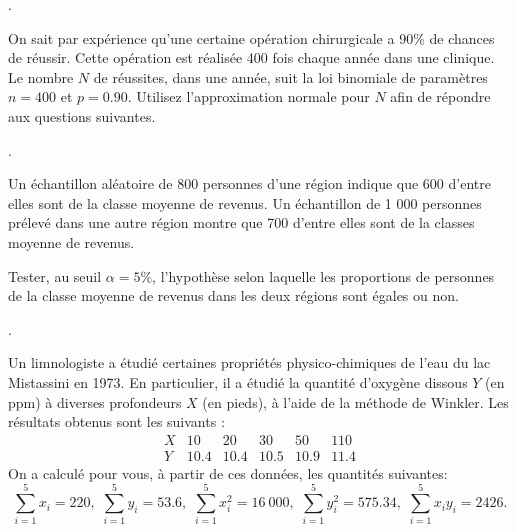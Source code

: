 \begin{questions}
\begin{parts}
\end{parts}




\newpage
.
\newpage

\question \label{assu}
On sait par expérience qu’une certaine opération chirurgicale a 90\% de
chances de réussir. Cette opération est réalisée  400 fois chaque année dans une clinique.
Le nombre $N$ de réussites, dans une année, suit la loi binomiale de paramètres $n= 400$ et $p= 0.90$. Utilisez  l’approximation normale pour $N$ afin de  répondre aux questions suivantes.

\newpage
.
\newpage

\question [10]
Un échantillon aléatoire de 800 personnes d'une région indique que
600 d'entre elles sont de la classe moyenne de revenus. Un
échantillon de 1 000 personnes prélevé dans une autre région montre
que 700 d'entre elles sont de la classes moyenne de revenus.

Tester, au seuil $\alpha=5\%$, l'hypothèse
selon laquelle les proportions de personnes de la classe moyenne de
revenus dans les deux régions sont égales ou non.

\newpage
.
\newpage

\question\label{reglin}
Un limnologiste a étudié certaines propriétés physico-chimiques de l'eau du lac Mistassini en 1973. En particulier, il a étudié la quantité d'oxygène dissous $Y$ (en ppm) à diverses profondeurs $X$ (en pieds), à l'aide de la méthode de Winkler. Les résultats obtenus sont les suivants :
\vspace{0.2 cm}
$$
\begin{array}{c|ccccc}
X & 10 & 20 & 30 & 50 & 110   \\  \hline
Y & 10.4 & 10.4 & 10.5 & 10.9 & 11.4
\end{array}
$$
On a calculé pour vous, à partir de ces données, les quantités suivantes:
$$
\sum_{i=1}^{5} x_i  = 220,\,\,  \sum_{i=1}^{5} y_i  = 53.6,\,\,
 \sum_{i=1}^{5} x_i^2  = 16\ 000,\,\,  \sum_{i=1}^{5} y_i^2  = 575.34,\,\,  \sum_{i=1}^{5} x_iy_i  = 2426.
$$\begin{parts}

\end{parts}
\end{questions}
